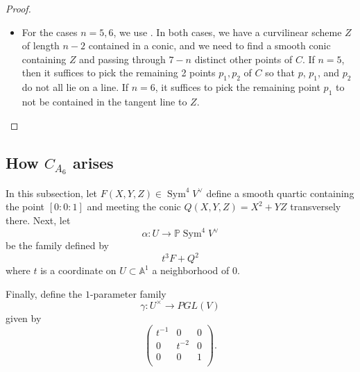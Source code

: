 \documentclass[12 pt, reqno]{amsart}
\theoremstyle{definition}
\newcommand{\on}{\operatorname}
\newcommand{\mb}{\mathbb}
\renewcommand{\P}{\mb{P}}
\begin{document}
\begin{proof}
\begin{itemize}
\item [{\bf Cases $n=5,6$}:]For the cases $n=5,6$, we use
  . In both cases, we have a curvilinear scheme $Z$
  of length $n-2$ contained in a conic, and we need to find a smooth
  conic containing $Z$ and passing through $7-n$ distinct other points
  of $C$. If $n=5$, then it suffices to pick the remaining 2 points
  $p_1,p_2$ of $C$ so that $p$, $p_1$, and $p_2$ do not all lie on a
  line. If $n=6$, it suffices to pick the remaining point $p_{1}$ to
  not be contained in the tangent line to $Z$.
\end{itemize}
\end{proof}


\subsection{How $C_{A_{6}}$ arises}

In this subsection, let $F(X,Y,Z) \in \on{Sym}^{4}V^{\vee}$ define a
smooth quartic containing the point $[0:0:1]$ and meeting the conic
$Q(X,Y,Z) = X^{2}+YZ$ transversely there.  Next, let
\[\alpha: U \to \P \on{Sym}^{4}V^{\vee}\] be the family defined by
\[t^{3}F + Q^{2}\] where $t$ is a coordinate on $U \subset \mb{A}^{1}$ a
neighborhood of $0$.

Finally, define the $1$-parameter family
\[\gamma: U^{\times} \to PGL(V)\] given by
\[\begin{pmatrix}
    t^{-1} & 0 & 0 \\
    0 & t^{-2} & 0 \\
    0 & 0 & 1\\
  \end{pmatrix}. \]
\end{document}
